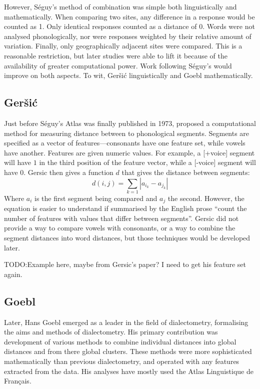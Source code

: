 \documentclass[11pt]{article}
\begin{document}
However, S\'eguy's method of combination was simple both
linguistically and mathematically. When comparing two sites, any
difference in a response would be counted as 1. Only identical
responses counted as a distance of 0. Words were not analysed
phonologically, nor were responses weighted by their relative amount
of variation. Finally, only geographically adjacent sites were
compared. This is a reasonable restriction, but later studies were
able to lift it because of the availability of greater computational
power. Work following S\'eguy's would improve on both aspects. To wit,
Ger\v{s}i\'c linguistically and Goebl mathematically.

\subsection{Ger\v{s}i\'c}
Just before S\'eguy's Atlas was finally published in 1973,
 proposed a computational method for measuring
distance between to phonological segments. Segments are specified as a
vector of features---consonants have one feature set, while vowels
have another. Features are given numeric values. For example, a
[+voice] segment will have $1$ in the third position of the feature
vector, while a [-voice] segment will have $0$. Gersic then gives a
function $d$ that gives the distance between segments:
\[ d(i,j) = \sum_{k=1} |a_{i_k} - a_{j_k}|\] Where $a_i$ is the first
segment
being compared and $a_j$ the second. However, the equation is easier
to understand if summarised by the English prose ``count the number of
features with values that differ between segments''. Gersic did not
provide a way to compare vowels with consonants, or a way to combine
the segment distances into word distances, but those techniques would
be developed later.

TODO:Example here, maybe from Gersic's paper? I need to get his
feature set again.

\subsection{Goebl}

Later, Hans Goebl emerged as a leader in the field of dialectometry,
formalising the aims and methods of dialectometry. His primary
contribution was development of various methods to combine individual
distances into global distances and from there global clusters. These
methods were more sophisticated mathematically than previous
dialectometry, and operated with any features extracted from the data. His
analyses have mostly used the Atlas Linguistique de Fran\c{c}ais.
\end{document}
